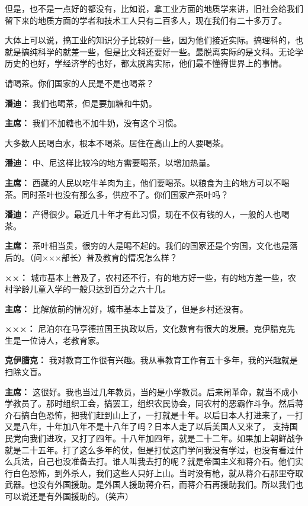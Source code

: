 \begin{list}{}
但是，也不是一点好的都没有，比如说，拿工业方面的地质学来讲，旧社会给我们留下来的地质方面的学者和技术工人只有二百多人，现在我们有二十多万了。

大体上可以说，搞工业的知识分子比较好一些，因为他们接近实际。搞理科的，也就是搞纯科学的就差一些，但是比文科还要好一些。最脱离实际的是文科。无论学历史的也好，学经济学的也好，都太脱离实际，他们最不懂得世界上的事情。

请喝茶。你们国家的人民是不是也喝茶？

\item[\textbf{潘迪：}] 我们也喝茶，但是要加糖和牛奶。

\item[\textbf{主席：}] 我们不加糖也不加牛奶，没有这个习惯。

大多数人民喝白水，根本不喝茶。居住在高山上的人要喝茶。

\item[\textbf{潘迪：}] 中、尼这样比较冷的地方需要喝茶，以增加热量。

\item[\textbf{主席：}] 西藏的人民以吃牛羊肉为主，他们要喝茶。以粮食为主的地方可以不喝茶。同时茶叶也没有那么多，供应不了。你们国家产茶叶吗？

\item[\textbf{潘迪：}] 产得很少。最近几十年才有此习惯，现在不仅有钱的人，一般的人也喝茶。

\item[\textbf{主席：}] 茶叶相当贵，很穷的人是喝不起的。我们的国家还是个穷国，文化也是落后的。（问×××部长）普及教育的情况怎么样？

\item[\textbf{××：}] 城市基本上普及了，农村还不行，有的地方好一些，有的地方差一些，农村学龄儿童入学的一般只达到百分之六十几。

\item[\textbf{主席：}] 比解放前的情况好，城市基本上普及了，但是乡村还没有。

\item[\textbf{×××：}] 尼泊尔在马享德拉国王执政以后，文化数育有很大的发展。克伊腊克先生是一位诗人，老教育家。

\item[\textbf{克伊腊克：}] 我对教育工作很有兴趣。我从事教育工作有五十多年，我的兴趣就是扫除文盲。

\item[\textbf{主席：}] 这很好。我也当过几年教员，当的是小学教员。后来闹革命，就当不成小学教员了。那时组织工会，搞罢工，组织农民协会，同农村的恶霸作斗争。然后蒋介石搞白色恐怖，把我们赶到山上了，一打就是十年。以后日本人打进来了，一打又是八年，十年加八年不是十八年了吗？日本人走了以后美国人又来了， 支持国民党向我们进攻，又打了四年。十八年加四年，就是二十二年。如果加上朝鲜战争就是二十五年。打了这么多年的仗，但是打仗这门学问我没有学过，也没有看过什么兵法，自己也没准备去打。谁人叫我去打的呢？就是帝国主义和蒋介石。他们实行白色恐怖，到外杀人，我们这些人只好上山。当时没有枪，就从蒋介石那里夺取武器。也没有外国援助。是外国人援助蒋介石，而蒋介石再援助我们。所以我们也可以说还是有外国援助的。（笑声）


\end{list}
